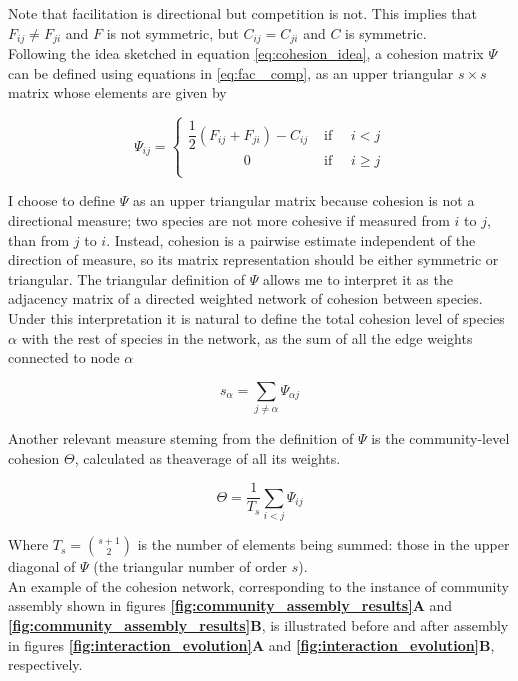 \documentclass[titlepage,11pt]{article}
\begin{document}
\begin{linenumbers}
\begin{singlespace}
\begin{linenomath*}
					\end{linenomath*}
					Note that facilitation is directional but competition is not. This implies that $ F_{ij} \neq F_{ji}$ and $ F $ is not symmetric, but $ C_{ij} = C_{ji} $ and $ C $ is symmetric.\\
					Following the idea sketched in equation \ref{eq:cohesion_idea}, a cohesion matrix $ \Psi $ can be defined using equations in \ref{eq:fac _comp},  as an upper triangular $ s \times s $ matrix whose elements are given by
					\begin{linenomath*}
						\begin{equation}
							\Psi_{ij} = 
							\begin{cases}
								\dfrac12 \left(F_{ij} + F_{ji}\right) -  C_{ij} & \text{ if }  \quad i < j \\
							    \quad\quad\quad\quad	0 & \text{ if } \quad  i \geq j\\
							\end{cases}
						\end{equation}
					\end{linenomath*}
					I choose to define $ \Psi $ as an upper triangular matrix because  cohesion is not a directional measure; two species are not more cohesive if measured from $ i $ to $ j $, than from $ j $ to $ i $. Instead, cohesion is a pairwise estimate independent of the direction of measure, so its matrix representation should be either symmetric or triangular. The triangular definition of $ \Psi $ allows me to  interpret it as the adjacency matrix of a directed weighted network of cohesion between species. Under this interpretation it is natural to define the total cohesion level of species $ \alpha $ with the rest of species in the network, as the sum of all the edge weights connected to node $ \alpha $
					\begin{linenomath*}
						\begin{equation}
						s_{\alpha} = \sum_{j \neq \alpha} \Psi_{\alpha j}
						\end{equation}
					\end{linenomath*}
					Another relevant measure steming from the definition of $ \Psi $ is the community-level cohesion $ \Theta $, calculated as theaverage of all its weights.
					\begin{linenomath*}
						\begin{equation}
						\Theta = \frac{1}{T_s}\sum_{i < j}\Psi_{ij}
						\end{equation}
					\end{linenomath*}
					Where $T_s = {s+1 \choose 2} $ is the number of elements being summed: those in the upper diagonal of $ \Psi $ (the triangular number of order $ s $).\\
					An example of the cohesion network, corresponding to the instance of community assembly shown in figures \textbf{\ref{fig:community_assembly_results}A} and \textbf{\ref{fig:community_assembly_results}B}, is illustrated before and after assembly in figures \textbf{\ref{fig:interaction_evolution}A} and \textbf{\ref{fig:interaction_evolution}B}, respectively. 


\end{singlespace}
\end{linenumbers}
\end{document}
